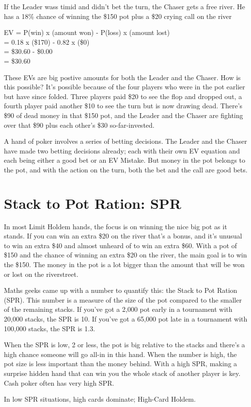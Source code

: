 If the Leader wass timid and didn't bet the turn, the Chaser gets a
free river. He has a 18\% chance of winning the \$150 pot plus a \$20
crying call on the river

EV = P(win) x (amount won) - P(loss) x (amount lost) \\
   = 0.18 x (\$170) - 0.82 x (\$0) \\
   = \$30.60 - \$0.00 \\
   = \$30.60


These EVs are big postive amounts for both the Leader and the
Chaser. How is this possible? It's possible because of the four
players who were in the pot earlier but have since folded. Three
players paid \$20 to see the flop and dropped out, a fourth player
paid another \$10 to see the turn but is now drawing dead. There's
\$90 of dead money in that \$150 pot, and the Leader and the Chaser
are fighting over that \$90 plus each other's \$30 so-far-invested.

A hand of poker involves a series of betting decisions. The Leader and
the Chaser have made two betting decisions already; each with their
own EV equation and each being either a good bet or an EV Mistake. But
money in the pot belongs to the pot, and with the action on the turn,
both the bet and the call are good bets.

\section{Stack to Pot Ration: SPR}

In most Limit Holdem hands, the focus is on winning the nice big pot
as it stands. If you can win an extra \$20 on the river that's a
bonus, and it's unusual to win an extra \$40 and almost unheard of to
win an extra \$60. With a pot of \$150 and the chance of winning an
extra \$20 on the river, the main goal is to win the \$150.
The money in the pot is a lot bigger than the amount that will be
won or lost on the riverstreet.

Maths geeks came up with a number to quantify this: the Stack to Pot
Ration (SPR). This number is a measure of the size of the pot compared
to the smaller of the remaining stacks. If you've got a 2,000 pot early
in a tournament with 20,000 stacks, the SPR is 10. If you've got a 65,000
pot late in a tournament with 100,000 stacks, the SPR is 1.3.

When the SPR is low, 2 or less, the pot is big relative to the stacks
and there's a high chance someone will go all-in in this hand. When
the number is high, the pot size is less important than the money behind.
With a high SPR, making a surprise hidden hand that can win you the whole
stack of another player is key. Cash poker often has very high SPR.

In low SPR situations, high cards dominate; High-Card Holdem.

